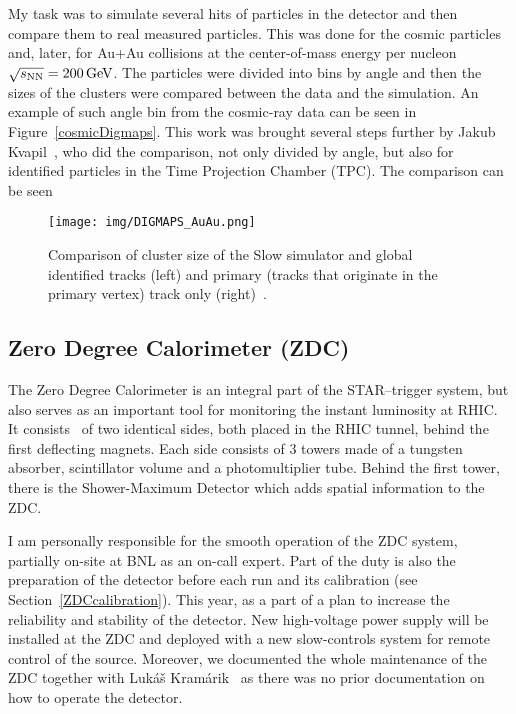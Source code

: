 My task was to simulate several hits of particles in the detector and then compare them to real measured particles. This was done for the cosmic particles and, later, for Au+Au collisions at the center-of-mass energy per nucleon $\sqrt{s_\text{NN}} = \SI{200}{\giga\electronvolt}$\@. The particles were divided into bins by angle and then the sizes of the clusters were compared between the data and the simulation. An example of such angle bin from the cosmic-ray data can be seen in Figure~\ref{cosmicDigmaps}.
This work was brought several steps further by Jakub Kvapil~\cite{KubaVyzkumak}, who did the comparison, not only divided by angle, but also for identified particles in the Time Projection Chamber (TPC). The comparison can be seen 

\begin{figure}[htb]
\begin{center}
 \texttt{[image: img/DIGMAPS\_AuAu.png]}\\
\end{center}
\caption{\label{AuAuDigmaps}Comparison of cluster size of the Slow simulator and global identified tracks (left) and primary (tracks that originate in the primary vertex) track only
(right)~\cite{KubaVyzkumak}.}
\end{figure}

\subsection*{Zero Degree Calorimeter (ZDC)}
The Zero Degree Calorimeter is an integral part of the STAR--trigger system, but also serves as an important tool for monitoring the instant luminosity at RHIC\@. It consists~\cite{ZDC, ZDCSMD} of two identical sides, both placed in the RHIC tunnel, behind 
the first deflecting magnets. Each side consists of 3 towers made of a tungsten absorber, scintillator volume and a photomultiplier tube.
Behind the first tower, there is the Shower-Maximum Detector which adds spatial information to the ZDC\@.

I am personally responsible for the smooth operation of the ZDC system, partially on-site at BNL as an on-call expert. Part of the duty is also the preparation of the detector before each run and its calibration (see Section~\ref{ZDCcalibration}). This year, as a part of a plan to increase the reliability and stability of the detector. New high-voltage power supply will be installed at the ZDC and deployed with a new slow-controls system for remote control of the source. Moreover, we documented the whole maintenance of the ZDC together with Lukáš Kramárik~\cite{ZDCmanual} as there was no prior documentation on how to operate the detector. 



